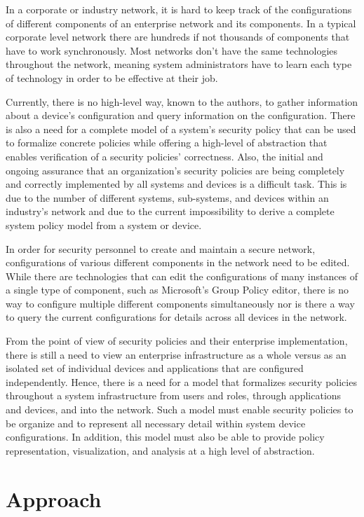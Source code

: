 \documentclass[12pt,letterpaper]{report}
\begin{document}
In a corporate or industry network, it is hard to keep track of the configurations of different components of an enterprise network and its components. In a typical corporate level network there are hundreds if not thousands of components that have to work synchronously. Most networks don't have the same technologies throughout the network, meaning system administrators have to learn each type of technology in order to be effective at their job.

Currently, there is no high-level way, known to the authors, to gather information about a device's configuration and query information on the configuration. There is also a need for a complete model of a system's security policy that can be used to formalize concrete policies while offering a high-level of abstraction that enables verification of a security policies' correctness. Also, the initial and ongoing assurance that an organization's security policies are being completely and correctly implemented by all systems and devices is a difficult task. This is due to the number of different systems, sub-systems, and devices within an industry's network and due to the current impossibility to derive a complete system policy model from a system or device.

In order for security personnel to create and maintain a secure network, configurations of various different components in the network need to be edited. While there are technologies that can edit the configurations of many instances of a single type of component, such as Microsoft's Group Policy editor, there is no way to configure multiple different components simultaneously nor is there a way to query the current configurations for details across all devices in the network. 

From the point of view of security policies and their enterprise implementation, there is still a need to view an enterprise infrastructure as a whole versus as an isolated set of individual devices and applications that are configured independently. Hence, there is a need for a model that formalizes security policies throughout a system infrastructure from users and roles, through applications and devices, and into the network. Such a model must enable security policies to be organize and to represent all necessary detail within system device configurations. In addition, this model must also be able to provide policy representation, visualization, and analysis at a high level of abstraction.

\section{Approach}
\end{document}
